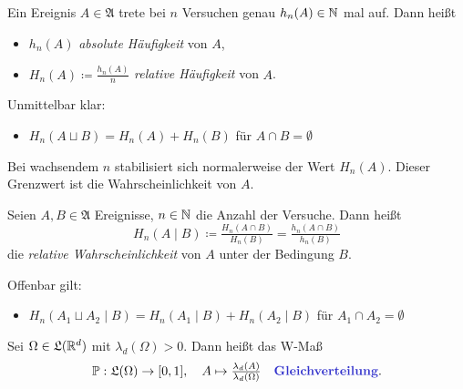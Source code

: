 \documentclass{cheat-sheet}
\newcommand{\Alg}{\mathfrak{A}} %
\newcommand{\LebAlg}{\mathfrak{L}} %
\renewcommand{\P}{\mathbb{P}} %
\begin{document}
\begin{defn}
  Ein Ereignis $A \in \Alg$ trete bei $n$ Versuchen genau $h_n(A) \in \mathbb{N}$ mal auf. Dann heißt
  \begin{itemize}
    \item $h_n(A)$ \emph{absolute Häufigkeit} von $A$,
    \item $H_n(A) \coloneqq \tfrac{h_n(A)}{n}$ \emph{relative Häufigkeit} von $A$.
  \end{itemize}
\end{defn}

\begin{bem}
  Unmittelbar klar:
  \begin{itemize}
    \item $H_n(A \sqcup B) = H_n(A) + H_n(B)$ für $A \cap B = \emptyset$
  \end{itemize}
\end{bem}

\begin{bem}
  Bei wachsendem $n$ stabilisiert sich normalerweise der Wert $H_n(A)$. Dieser Grenzwert ist die Wahrscheinlichkeit von $A$.
\end{bem}



\begin{defn}
  Seien $A, B \in \Alg$ Ereignisse, $n \in \mathbb{N}$ die Anzahl der Versuche. Dann heißt
  \[ H_n(A \mid B) \coloneqq \tfrac{H_n(A \cap B)}{H_n(B)} = \tfrac{h_n(A \cap B)}{h_n(B)} \]
  die \emph{relative Wahrscheinlichkeit} von $A$ unter der Bedingung $B$.
\end{defn}

\begin{bem}
  Offenbar gilt:
  \begin{itemize}
    \item $H_n(A_1 \sqcup A_2 \mid B) = H_n(A_1 \mid B) + H_n(A_2 \mid B)$ für $A_1 \cap A_2 = \emptyset$
  \end{itemize}
\end{bem}


\begin{defn}
  Sei $\Omega \in \LebAlg(\R^d)$ mit $\lambda_d(\Omega) > 0$. Dann heißt das W-Maß
  \[ \P : \LebAlg(\Omega) \to [0, 1], \quad A \mapsto \tfrac{\lambda_d(A)}{\lambda_d(\Omega)} \quad \text{\emph{Gleichverteilung}.} \]
\end{defn}
\end{document}
